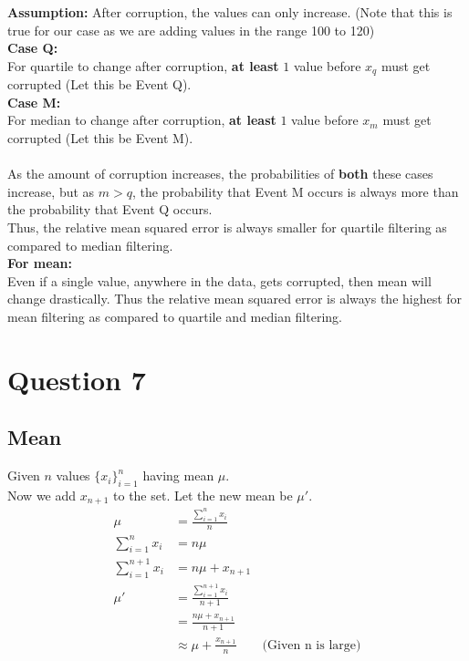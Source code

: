 \documentclass[11pt]{article}
\begin{document}
\medskip
\textbf{Assumption:} After corruption, the values can only increase. (Note that this is true for our case as we are adding values in the range 100 to 120)\\
\textbf{Case Q:}\\
For quartile to change after corruption, \textbf{at least} $1$ value before $x_q$ must get corrupted (Let this be Event Q).\\
\textbf{Case M:}\\
For median to change after corruption, \textbf{at least} $1$ value before $x_m$ must get corrupted (Let this be Event M).\\
\\
As the amount of corruption increases, the probabilities of \textbf{both} these cases increase, but as $m > q$, the probability that Event M occurs is always more than the probability that Event Q occurs.\\
Thus, the relative mean squared error is always smaller for quartile filtering as compared to median filtering.\\

\medskip
\textbf{For mean:}\\
Even if a single value, anywhere in the data, gets corrupted, then mean will change drastically. Thus the relative mean squared error is always the highest for mean filtering as compared to quartile and median filtering.



\newpage
\section*{Question 7}

\subsection*{Mean}
Given $n$ values $\{x_i\}^n_{i=1}$ having mean $\mu$.\\
Now we add $x_{n+1}$ to the set. Let the new mean be $\mu'$.
\begin{equation*}
    \begin{split}
    \mu &= \frac{\sum_{i=1}^{n} x_i}{n} \\
    \sum_{i=1}^{n} x_i &= n\mu \\
    \sum_{i=1}^{n+1} x_i &= n\mu + x_{n+1} \\
    \mu' &= \frac{\sum_{i=1}^{n+1} x_i}{n+1} \\
        &= \frac{n\mu + x_{n+1}}{n+1} \\
        &\approx \mu + \frac{x_{n+1}}{n} \hspace{2em} \text{(Given n is large)} \\
    \end{split}
\end{equation*}
\end{document}
